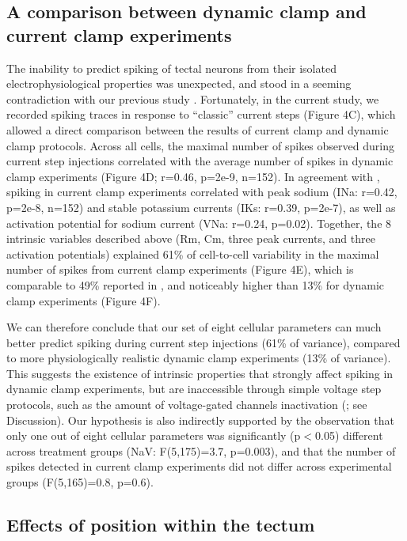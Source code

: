 \documentclass{article}
\begin{document}
\subsection*{A comparison between dynamic clamp and current clamp experiments}

The inability to predict spiking of tectal neurons from their isolated electrophysiological properties was unexpected, and stood in a seeming contradiction with our previous study \citep{ciarleglio2015}. Fortunately, in the current study, we recorded spiking traces in response to “classic” current steps (Figure 4C), which allowed a direct comparison between the results of current clamp and dynamic clamp protocols. Across all cells, the maximal number of spikes observed during current step injections correlated with the average number of spikes in dynamic clamp experiments (Figure 4D; r=0.46, p=2e-9, n=152). In agreement with \citep{ciarleglio2015}, spiking in current clamp experiments correlated with peak sodium (INa: r=0.42, p=2e-8, n=152) and stable potassium currents (IKs: r=0.39, p=2e-7), as well as activation potential for sodium current (VNa: r=0.24, p=0.02). Together, the 8 intrinsic variables described above (Rm, Cm, three peak currents, and three activation potentials) explained 61\% of cell-to-cell variability in the maximal number of spikes from current clamp experiments (Figure 4E), which is comparable to 49\% reported in \citep{ciarleglio2015}, and noticeably higher than 13\% for dynamic clamp experiments (Figure 4F).

We can therefore conclude that our set of eight cellular parameters can much better predict spiking during current step injections (61\% of variance), compared to more physiologically realistic dynamic clamp experiments (13\% of variance). This suggests the existence of intrinsic properties that strongly affect spiking in dynamic clamp experiments, but are inaccessible through simple voltage step protocols, such as the amount of voltage-gated channels inactivation (\citealt{zbili2019axonnav}; see Discussion). Our hypothesis is also indirectly supported by the observation that only one out of eight cellular parameters was significantly (p$<$0.05) different across treatment groups (NaV: F(5,175)=3.7, p=0.003), and that the number of spikes detected in current clamp experiments did not differ across experimental groups (F(5,165)=0.8, p=0.6). 

\subsection*{Effects of position within the tectum}
\end{document}
